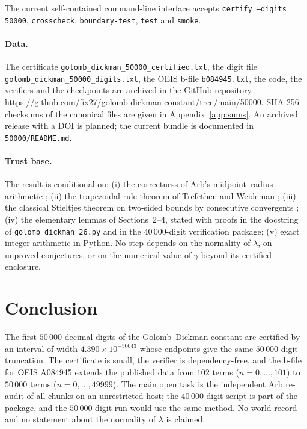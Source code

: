 \documentclass[11pt,a4paper]{article}
\theoremstyle{remark}
\newcommand{\lam}{\lambda}
\begin{document}
The current self-contained command-line interface accepts
\texttt{certify --digits 50000}, \texttt{crosscheck},
\texttt{boundary-test}, \texttt{test} and \texttt{smoke}.

\paragraph{Data.}
The certificate \texttt{golomb\_dickman\_50000\_certified.txt}, the
digit file \texttt{golomb\_dickman\_50000\_digits.txt}, the OEIS b-file
\texttt{b084945.txt}, the code, the verifiers and the checkpoints are
archived in the GitHub repository
\url{https://github.com/fix27/golomb-dickman-constant/tree/main/50000}.
SHA-256 checksums of the canonical files are given in
Appendix~\ref{app:sums}. An archived release with a DOI is planned; the
current bundle is documented in \texttt{50000/README.md}.

\paragraph{Trust base.}
The result is conditional on:
(i) the correctness of Arb's midpoint--radius arithmetic
\cite{johansson2017};
(ii) the trapezoidal rule theorem of Trefethen and Weideman
\cite[Thm.~5.1]{TW2014};
(iii) the classical Stieltjes theorem on two-sided bounds by consecutive
convergents \cite{stieltjes1894};
(iv) the elementary lemmas of Sections~2--4, stated with proofs in the
docstring of \texttt{golomb\_dickman\_26.py} and in the $40\,000$-digit
verification package;
(v) exact integer arithmetic in Python.
No step depends on the normality of $\lam$, on unproved conjectures, or
on the numerical value of $\gamma$ beyond its certified enclosure.

\section{Conclusion}

The first $50\,000$ decimal digits of the Golomb--Dickman constant are
certified by an interval of width $4.390\times10^{-50043}$ whose
endpoints give the same $50\,000$-digit truncation. The certificate is
small, the verifier is dependency-free, and the b-file for OEIS A084945
extends the published data from $102$ terms ($n=0,\ldots,101$) to
$50\,000$ terms ($n=0,\ldots,49999$). The main open task is the
independent Arb re-audit of all chunks on an unrestricted host; the
$40\,000$-digit script is part of the package, and the $50\,000$-digit
run would use the same method. No world record and no statement about
the normality of $\lam$ is claimed.
\end{document}
